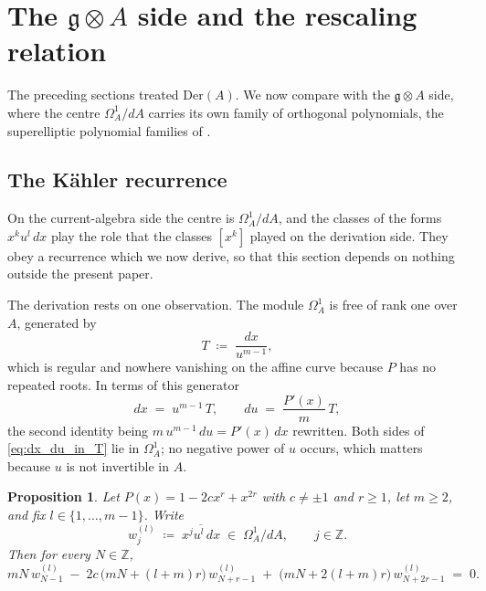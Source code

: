 \documentclass[11pt]{amsart}
\newtheorem{proposition}[theorem]{Proposition}
\theoremstyle{definition}
\theoremstyle{remark}
\newcommand{\Z}{\mathbb{Z}}
\newcommand{\g}{\mathfrak{g}}
\newcommand{\Der}{\mathrm{Der}}
\newcommand{\ol}[1]{\overline{#1}}
\begin{document}
\section{The \texorpdfstring{$\g\otimes A$}{g tensor A} side
  and the rescaling relation}
\label{sec:SNF}

The preceding sections treated $\Der(A)$.
We now compare with the $\g\otimes A$ side, where the centre
$\Omega^1_A/dA$ carries its own family of orthogonal polynomials,
the superelliptic polynomial families of
\cite{SantosNeklyudovFutorny2025}.

\subsection{The K\"ahler recurrence}

On the current-algebra side the centre is $\Omega^1_A/dA$, and the classes of
the forms $x^{k}u^l\,dx$ play the role that the classes $[x^k]$ played on the
derivation side. They obey a recurrence which we now derive, so that this
section depends on nothing outside the present paper.

The derivation rests on one observation. The module $\Omega^1_A$ is free of
rank one over $A$, generated by
\begin{equation}\label{eq:Tgen}
  T \;\coloneqq\; \frac{dx}{u^{m-1}} ,
\end{equation}
which is regular and nowhere vanishing on the affine curve because $P$ has no
repeated roots. In terms of this generator
\begin{equation}\label{eq:dx_du_in_T}
  dx \;=\; u^{m-1}\,T ,
  \qquad
  du \;=\; \frac{P'(x)}{m}\,T ,
\end{equation}
the second identity being $m\,u^{m-1}\,du=P'(x)\,dx$ rewritten. Both sides of
\eqref{eq:dx_du_in_T} lie in $\Omega^1_A$; no negative power of $u$ occurs,
which matters because $u$ is not invertible in $A$.

\begin{proposition}\label{prop:kahler_rec}
Let $P(x)=1-2cx^r+x^{2r}$ with $c\neq\pm1$ and $r\geq1$, let $m\geq2$, and fix
$l\in\{1,\ldots,m-1\}$. Write
\[
  w^{(l)}_j \;\coloneqq\; \ol{x^{j}u^l\,dx} \;\in\; \Omega^1_A/dA ,
  \qquad j\in\Z .
\]
Then for every $N\in\Z$,
\begin{equation}\label{eq:kahler_rec}
  mN\,w^{(l)}_{N-1}
  \;-\; 2c\,\bigl(mN+(l+m)r\bigr)\,w^{(l)}_{N+r-1}
  \;+\; \bigl(mN+2(l+m)r\bigr)\,w^{(l)}_{N+2r-1} \;=\; 0 .
\end{equation}
\end{proposition}
\end{document}
